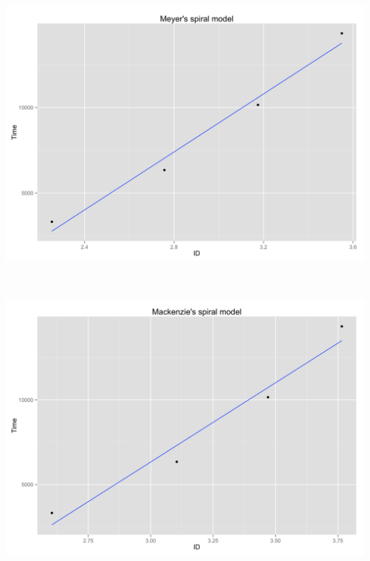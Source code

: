 \begin{minipage}{\linewidth}
	\begin{minipage}[t]{.45\linewidth}
		\includegraphics[width=\textwidth]{images/plots/plot_model_spiral_meyer}
		\label{fig:meyer_spiral_line}
	\end{minipage}
	\begin{minipage}[b]{0.1\linewidth}
	~
	\end{minipage}
	\begin{minipage}[t]{0.45\linewidth}
		\includegraphics[width=\textwidth]{images/plots/plot_model_spiral_mackenzie}
		\label{fig:mackenzie_spiral_line}
	\end{minipage}
\end{minipage}
